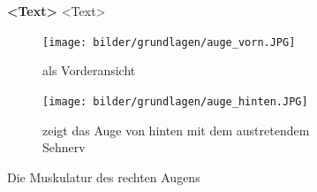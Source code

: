 \begin{figure}[h]
\begin{center}
\end{center}
\caption{\textbf{<Text>} <Text> }
\label{fig:<name>}
\end{figure}
\begin{figure}[ht]
    \centering
    \begin{subfigure}[t]{0.49\textwidth}
        \texttt{[image: bilder/grundlagen/auge\_vorn.JPG]}
        \caption{als Vorderansicht}
        \label{fig:augeVorne}
    \end{subfigure}
    \begin{subfigure}[t]{0.49\textwidth}
        \texttt{[image: bilder/grundlagen/auge\_hinten.JPG]}
        \caption{zeigt das Auge von hinten mit dem austretendem Sehnerv}
        \label{fig:augeHinten}
    \end{subfigure}
    \caption{Die Muskulatur des rechten Augens}\label{fig:rechtesAuge}
\end{figure}
